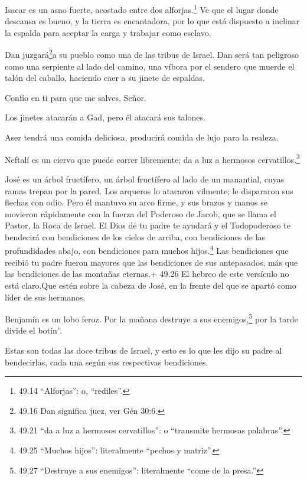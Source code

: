  Isacar es un asno fuerte, acostado entre dos
alforjas.\footnote{49.14 ``Alforjas'': o, ``rediles''.}  Ve
que el lugar donde descansa es bueno, y la tierra es encantadora, por lo
que está dispuesto a inclinar la espalda para aceptar la carga y
trabajar como esclavo.

 Dan juzgará\footnote{49.16 Dan significa juez, ver Gén
  30:6.}a su pueblo como una de las tribus de Israel.  Dan
será tan peligroso como una serpiente al lado del camino, una víbora por
el sendero que muerde el talón del caballo, haciendo caer a su jinete de
espaldas.

 Confío en ti para que me salves, Señor.

 Los jinetes atacarán a Gad, pero él atacará sus talones.

 Aser tendrá una comida deliciosa, producirá comida de lujo
para la realeza.

 Neftalí es un ciervo que puede correr libremente; da a luz
a hermosos cervatillos.\footnote{49.21 ``da a luz a hermosos
  cervatillos'': o ``transmite hermosas palabras''.}

 José es un árbol fructífero, un árbol fructífero al lado
de un manantial, cuyas ramas trepan por la pared.  Los
arqueros lo atacaron vilmente; le dispararon sus flechas con odio.
 Pero él mantuvo su arco firme, y sus brazos y manos se
movieron rápidamente con la fuerza del Poderoso de Jacob, que se llama
el Pastor, la Roca de Israel.  El Dios de tu padre te
ayudará y el Todopoderoso te bendecirá con bendiciones de los cielos de
arriba, con bendiciones de las profundidades abajo, con bendiciones para
muchos hijos.\footnote{49.25 ``Muchos hijos'': literalmente ``pechos y
  matriz''.}  Las bendiciones que recibió tu padre fueron
mayores que las bendiciones de sus antepasados, más que las bendiciones
de las montañas eternas.+ 49.26 El hebreo de este versículo no está
claro.Que estén sobre la cabeza de José, en la frente del que se apartó
como líder de sus hermanos.

 Benjamín es un lobo feroz. Por la mañana destruye a sus
enemigos,\footnote{49.27 ``Destruye a sus enemigos'': literalmente
  ``come de la presa.''} por la tarde divide el botín''.

 Estas son todas las doce tribus de Israel, y esto es lo
que les dijo su padre al bendecirlas, cada una según sus respectivas
bendiciones.

